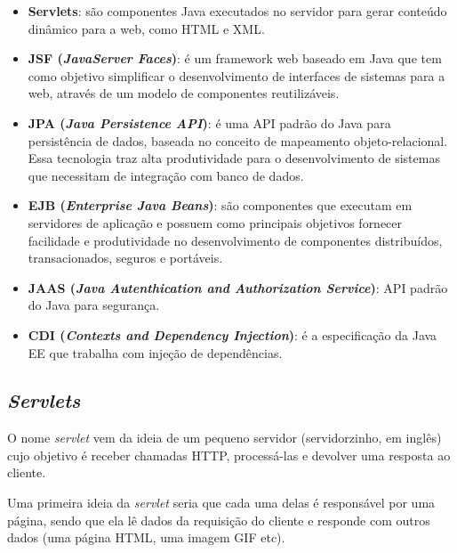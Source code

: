 \begin{itemize}
	\item \textbf{Servlets}: são componentes Java executados no servidor para gerar conteúdo dinâmico para a web, como HTML e XML.
	\item \textbf{JSF (\textit{JavaServer Faces})}: é um framework web baseado em Java que tem como objetivo simplificar o desenvolvimento de interfaces de sistemas para a web, através de um modelo de componentes reutilizáveis. 
	\item \textbf{JPA (\textit{Java Persistence API})}: é uma API padrão do Java para persistência de dados, baseada no conceito de mapeamento objeto-relacional. Essa tecnologia traz alta produtividade para o desenvolvimento de sistemas que necessitam de integração com banco de dados. 
	\item \textbf{EJB (\textit{Enterprise Java Beans})}: são componentes que executam em servidores de aplicação e possuem como principais objetivos fornecer facilidade e produtividade no desenvolvimento de componentes distribuídos, transacionados, seguros e portáveis.
	\item \textbf{JAAS (\textit{Java Autenthication and Authorization Service})}: API padrão do Java para segurança.
	\item \textbf{CDI (\textit{Contexts and Dependency Injection})}: é a especificação da Java EE que trabalha com injeção de dependências.	
\end{itemize}






\subsection{\textit{Servlets}}

O nome \textit{servlet} vem da ideia de um pequeno servidor (servidorzinho, em inglês) cujo objetivo é receber chamadas HTTP, processá-las e devolver uma resposta ao cliente\cite{caelumDesenvolvimento}.

Uma primeira ideia da \textit{servlet} seria que cada uma delas é responsável por uma página, sendo que ela lê dados da requisição do cliente e responde com outros dados (uma página HTML, uma imagem GIF etc).

